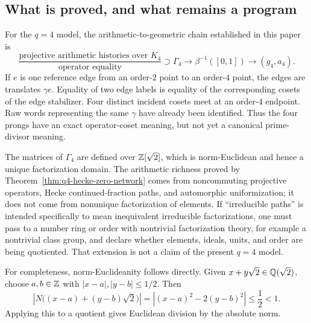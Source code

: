 \subsection{What is proved, and what remains a program}

For the $q=4$ model, the arithmetic-to-geometric chain established in this paper
is
\begin{equation}
 \frac{\text{projective arithmetic histories over }K_4}
      {\text{operator equality}}
 \supset \Gamma_4
 \longrightarrow \beta^{-1}([0,1])
 \longrightarrow (g_4,a_4).
 \label{eq:q4-established-chain}
\end{equation}
If $e$ is one reference edge from an order-$2$ point to an order-$4$ point, the
edges are translates $\gamma e$.  Equality of two edge labels is equality of the
corresponding cosets of the edge stabilizer.  Four distinct incident cosets meet
at an order-$4$ endpoint.  Raw words representing the same $\gamma$ have already
been identified.  Thus the four prongs have an exact operator-coset meaning, but
not yet a canonical prime-divisor meaning.

\begin{remark}
The matrices of $\Gamma_4$ are defined over $\mathbb{Z}[\sqrt2]$, which is
norm-Euclidean and hence a unique factorization domain.  The arithmetic richness
proved by Theorem~\ref{thm:q4-hecke-zero-network} comes from noncommuting
projective operators, Hecke continued-fraction paths, and automorphic
uniformization; it does not come from nonunique factorization of elements.  If
``irreducible paths'' is intended specifically to mean inequivalent irreducible
factorizations, one must pass to a number ring or order with nontrivial
factorization theory, for example a nontrivial class group, and declare whether
elements, ideals, units, and order are being quotiented.  That extension is not a
claim of the present $q=4$ model.

For completeness, norm-Euclideanity follows directly.  Given
$x+y\sqrt2\in\mathbb{Q}(\sqrt2)$, choose $a,b\in\mathbb{Z}$ with
$|x-a|,|y-b|\le1/2$.  Then
\[
 \left|N\bigl((x-a)+(y-b)\sqrt2\bigr)\right|
 =\left|(x-a)^2-2(y-b)^2\right|\le\frac12<1.
\]
Applying this to a quotient gives Euclidean division by the absolute norm.
\end{remark}

